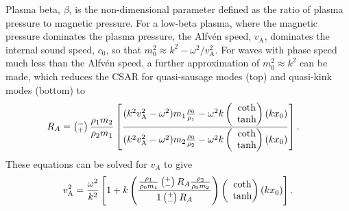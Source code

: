 \documentclass[namedreferences]{solarphysics}
\numberwithin{equation}{section}
\begin{document}
\begin{article}
Plasma beta, $\beta$, is the non-dimensional parameter defined as the ratio of plasma pressure to magnetic pressure. For a low-beta plasma, where the magnetic pressure dominates the plasma pressure, the Alfv\'{e}n speed, $v_\textrm{A}$, dominates the internal sound speed, $c_0$, so that $m_0^2 \approx k^2-\omega^2/v_\textrm{A}^2$. For waves with phase speed much less than the Alfv\'{e}n speed, a further approximation of $m_0^2 \approx k^2$ can be made, which reduces the CSAR for quasi-sausage modes (top) and quasi-kink modes (bottom) to
\begin{align}
R_A &= \left(\substack{- \\ +}\right) \frac{\rho_1m_2}{\rho_2m_1} \left[ \frac{(k^2v_\textrm{A}^2-\omega^2)m_1\frac{\rho_0}{\rho_1}-\omega^2k \left(\hspace{-0.07in}\begin{matrix} &\coth \\ &\tanh \end{matrix}\right)(kx_0)}{(k^2v_\textrm{A}^2-\omega^2)m_2\frac{\rho_0}{\rho_2}-\omega^2k \left(\hspace{-0.07in}\begin{matrix} &\coth \\ &\tanh \end{matrix}\right)(kx_0)} \right].
\end{align}
These equations can be solved for $v_A$ to give
\begin{equation}
v_\textrm{A}^2 = \frac{\omega^2}{k^2} \left[1 + k \left( \frac{ \frac{\rho_1}{\rho_0m_1} \left(\substack{+ \\ -}\right) R_A\frac{\rho_2}{\rho_0m_2}}{1 \left(\substack{+ \\ -}\right) R_A} \right) \left(\hspace{-0.07in}\begin{matrix} &\coth \\ &\tanh \end{matrix}\right) (kx_0)\right].
\end{equation}




\end{article}
\end{document}
